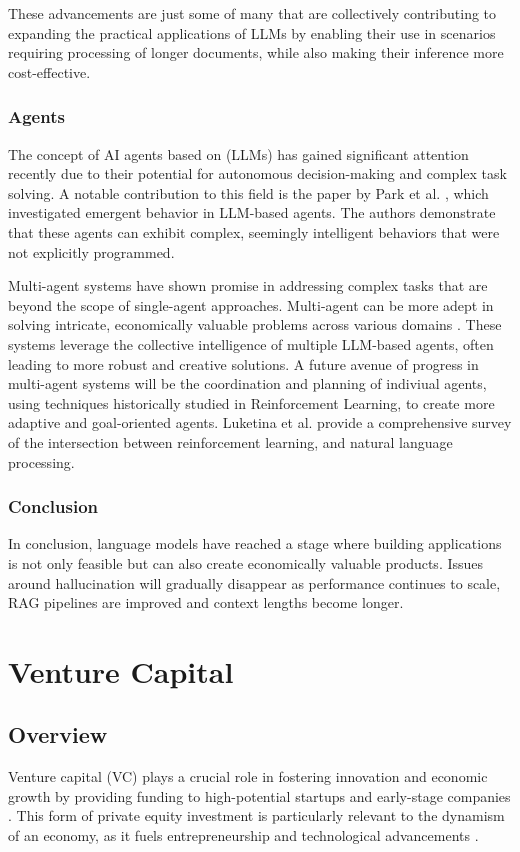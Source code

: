 \documentclass[a4paper, oneside]{discothesis}
\begin{document}
These advancements are just some of many that are collectively contributing to expanding the practical applications of LLMs by enabling their use in scenarios requiring processing of longer documents, while also making their inference more cost-effective. 

\subsection{Agents}
The concept of AI agents based on (LLMs) has gained significant attention recently due to their potential for autonomous decision-making and complex task solving. A notable contribution to this field is the paper by Park et al. \cite{park2023generativeagentsinteractivesimulacra}, which investigated emergent behavior in LLM-based agents. The authors demonstrate that these agents can exhibit complex, seemingly intelligent behaviors that were not explicitly programmed.

Multi-agent systems have shown promise in addressing complex tasks that are beyond the scope of single-agent approaches. Multi-agent can be more adept in solving intricate, economically valuable problems across various domains \cite{chen2024autoagentsframeworkautomaticagent}. 
These systems leverage the collective intelligence of multiple LLM-based agents, often leading to more robust and creative solutions. A future avenue of progress in multi-agent systems will be the coordination and planning of indiviual agents, using techniques historically studied in Reinforcement Learning, to create more adaptive and goal-oriented agents. Luketina et al. \cite{luketina2019survey} provide a comprehensive survey of the intersection between reinforcement learning, and natural language processing.

\subsection{Conclusion}
In conclusion, language models have reached a stage where building applications is not only feasible but can also create economically valuable products. Issues around hallucination will gradually disappear as performance continues to scale, RAG pipelines are improved and context lengths become longer.

\chapter{Venture Capital}
\section{Overview}
Venture capital (VC) plays a crucial role in fostering innovation and economic growth by providing funding to high-potential startups and early-stage companies \cite{gompers2001venture}. This form of private equity investment is particularly relevant to the dynamism of an economy, as it fuels entrepreneurship and technological advancements \cite{kortum2000assessing_contribution_venture_capital}.
\end{document}
